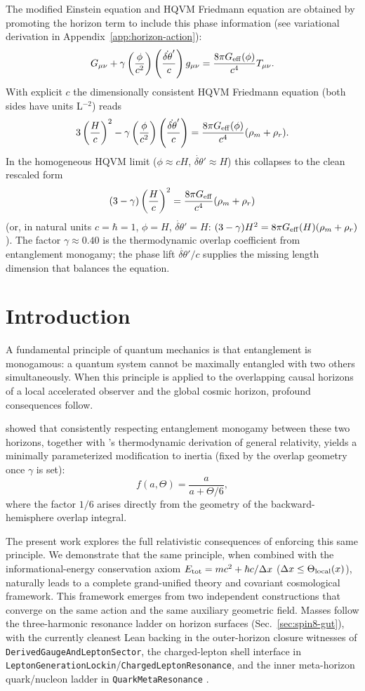 \documentclass[12pt,a4paper]{article}
\begin{document}
The modified Einstein equation and HQVM Friedmann equation are obtained by promoting the horizon term to include this phase information (see variational derivation in Appendix~\ref{app:horizon-action}):
\[
G_{\mu\nu} + \gamma \left( \frac{\phi}{c^2} \right) \left( \frac{\dot{\delta\theta}'}{c} \right) g_{\mu\nu} = \frac{8\pi G_{\rm eff}(\phi)}{c^4} T_{\mu\nu}.
\]
With explicit \(c\) the dimensionally consistent HQVM Friedmann equation (both sides have units L$^{-2}$) reads
\[
3\left(\frac{H}{c}\right)^2 - \gamma \left( \frac{\phi}{c^2} \right) \left( \frac{\dot{\delta\theta}'}{c} \right) = \frac{8\pi G_{\rm eff}(\phi)}{c^4}(\rho_m + \rho_r).
\]
In the homogeneous HQVM limit (\(\phi \approx c H\), \(\dot{\delta\theta}' \approx H\)) this collapses to the clean rescaled form
\[
(3 - \gamma) \left(\frac{H}{c}\right)^2 = \frac{8\pi G_{\rm eff}}{c^4} (\rho_m + \rho_r)
\]
(or, in natural units \(c=\hbar=1\), \(\phi = H\), \(\dot{\delta\theta}' = H\): \((3-\gamma)H^2 = 8\pi G_{\rm eff}(H)(\rho_m + \rho_r)\)). 
The factor \(\gamma \approx 0.40\) is the thermodynamic overlap coefficient from entanglement monogamy; the phase lift \(\dot{\delta\theta}'/c\) supplies the missing length dimension that balances the equation.

\section{Introduction}

A fundamental principle of quantum mechanics is that entanglement is monogamous: a quantum system cannot be maximally entangled with two others simultaneously. When this principle is applied to the overlapping causal horizons of a local accelerated observer and the global cosmic horizon, profound consequences follow.

\citet{brodie2026} showed that consistently respecting entanglement monogamy between these two horizons, together with \citet{Jacobson1995}'s thermodynamic derivation of general relativity, yields a minimally parameterized modification to inertia (fixed by the overlap geometry once $\gamma$ is set):
\[
f(a,\Theta) = \frac{a}{a + \Theta/6},
\]
where the factor $1/6$ arises directly from the geometry of the backward-hemisphere overlap integral.

The present work explores the full relativistic consequences of enforcing this same principle. We demonstrate that the same principle, when combined with the informational-energy conservation axiom \(E_{\rm tot} = mc^2 + \hbar c / \Delta x\) (\(\Delta x \le \Theta_{\rm local}(x)\)), naturally leads to a complete grand-unified theory and covariant cosmological framework. This framework emerges from two independent constructions that converge on the same action and the same auxiliary geometric field.
Masses follow the three-harmonic resonance ladder on horizon surfaces (Sec.~\ref{sec:spin8-gut}), with the currently cleanest Lean backing in the outer-horizon closure witnesses of \texttt{DerivedGaugeAndLeptonSector}, the charged-lepton shell interface in \texttt{LeptonGenerationLockin}/\texttt{ChargedLeptonResonance}, and the inner meta-horizon quark/nucleon ladder in \texttt{QuarkMetaResonance} \citep{hqiv-lean}.
\end{document}
